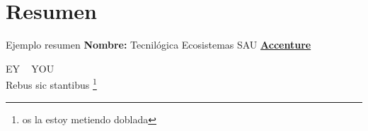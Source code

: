 \blankpage
\newpage
\thispagestyle{empty}
\section*{Resumen}
Ejemplo resumen
\textbf{Nombre:} Tecnilógica Ecosistemas SAU \href{https://www.accenture.com/es-es/company-tecnilogica-accenture}{\textbf{\color{blue}Accenture}}
\par EY ~\cite{virt2} YOU ~\cite{cont2} \\
Rebus sic stantibus \footnote{os la estoy metiendo doblada}
\afterpage{\blankpage}
